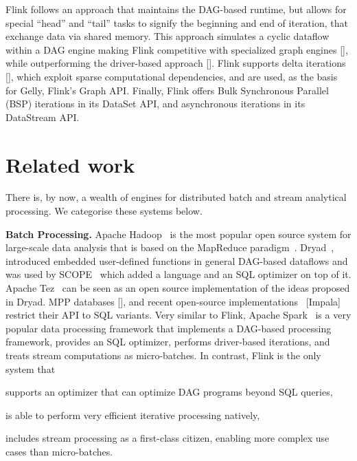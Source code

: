 \documentclass{sig-alternate}
\begin{document}
Flink follows an approach that maintains the DAG-based runtime, but allows for special ``head'' and ``tail'' tasks to signify the beginning and end of iteration, that exchange data via shared memory. This approach simulates a cyclic dataflow within a DAG engine making Flink competitive with specialized graph engines [], while outperforming the driver-based approach []. Flink supports delta iterations [], which exploit sparse computational dependencies, and are used, as the basis for Gelly, Flink's Graph API. Finally, Flink offers Bulk Synchronous Parallel (BSP) iterations in its DataSet API, and asynchronous iterations in its DataStream API.


\section{Related work}

There is, by now, a wealth of engines for distributed batch and stream analytical processing. We categorise these systems below. 

\textbf{Batch Processing.} Apache Hadoop~\cite{CUSTOM:web/Hadoop} is the most popular open source system for large-scale data analysis that is based on the MapReduce paradigm~\cite{DBLP:journals/cacm/DeanG08}. Dryad~\cite{dryad}, introduced embedded user-defined functions in general DAG-based dataflows and was used by SCOPE~\cite{scopeOptimizer} which added a language and an SQL optimizer on top of it. Apache Tez~\cite{CUSTOM:web/Tez} can be seen as an open source implementation of the ideas proposed in Dryad. MPP databases [], and recent open-source implementations~\cite{CUSTOM:web/Drill} [Impala] restrict their API to SQL variants. Very similar to Flink, Apache Spark~\cite{CUSTOM:web/Spark} is a very popular data processing framework that implements a DAG-based processing framework, provides an SQL optimizer, performs driver-based iterations, and treats stream computations as micro-batches. In contrast, Flink is the only system that
\begin{inparaenum}[i)]
  \item supports an optimizer that can optimize DAG programs beyond SQL queries,
  \item is able to perform very efficient iterative processing natively,
  \item includes stream processing as a first-class citizen, enabling more complex use cases than micro-batches.
\end{inparaenum}
\end{document}
